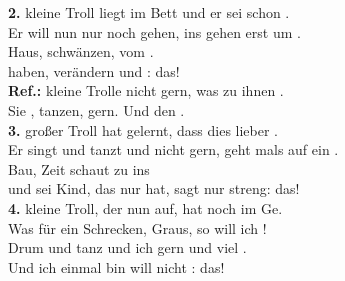 

\textbf{2.} kleine Troll liegt  im Bett und  er sei schon .\\
Er will nun nur noch  gehen, ins  gehen erst um .\\
Haus,  schwänzen,   vom .\\
 haben,  verändern und  :  das!\\
\textbf{Ref.:}  kleine Trolle  nicht gern, was  zu ihnen .\\
Sie , tanzen,  gern. Und  den  .\\[0.5em]
\textbf{3.}  großer Troll hat  gelernt, dass  dies lieber .\\
Er singt und tanzt und  nicht gern, geht mals auf ein .\\
Bau,  Zeit schaut  zu  ins  \\
und sei Kind, das  nur hat, sagt  nur  streng:  das!\\[0.5em]
\textbf{4.}  kleine Troll, der  nun auf, hat  noch im Ge.\\
Was für ein Schrecken,  Graus, so  will ich ! \\
Drum  und tanz und  ich gern und   viel . \\
Und  ich einmal  bin will  nicht :  das!

